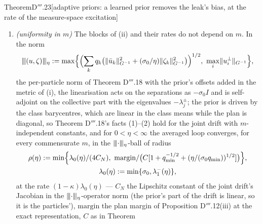 \begin{thm}{Theorem}{D$'''$.23}[adaptive priors: a learned prior removes the leak's bias, at the rate of the
measure-space excitation]
\begin{enumerate}[label=\textup{(\roman*)}]
    the prior follows the class barycentres, $z_j = \hat T_j$, and \textup{($\mathfrak{A}_m^{\mathrm{OT},\eta}$)}
    becomes the gradient flow of $\bar L(\mu_\Theta) + (\sigma_0/2)\mathcal{Q}_q(\mu_\Theta)$, with
    $\mathcal{Q}_q(\mu) := \min_ZW^2(\mu,\nu_Z)$ the capacity-constrained $K_0$-means distortion of $\mu$ ---
    along the plan the flow carries, which is optimal for its own barycentres (Lloyd-consistent) and need not be
    jointly optimal: the flow follows the selected piece of $\mathcal{Q}_q$, and $\mathcal{Q}_q$ itself need not
    decrease (\hyperref[res:thmDppp:27]{Proposition D$'''$.27}(ii)) ---: a regulariser that pulls the network
    toward $K_0$ clusters of the prescribed masses without biasing where they sit.
    The separations keep the rate $\sigma_0$, and mode $j$ of the class means relaxes at $h_j$. It does bias how many
    there are: a target that the network fits exactly only with a class split is fitted with $K_0$ clusters
    (numerics, Part G), so $K_0$ remains a design input.
  \item \emph{(uniformity in $m$)} The blocks of (ii) and their rates do not depend on $m$. In the norm
    \[
      \tnorm{(u,\zeta)}_\eta := \max\Bigl\{\Bigl(\sum_kq_k\bigl(\norm{\bar u_k}^2_{\Ginv}
      + (\sigma_0/\eta)\norm{\zeta_k}^2_{\Ginv}\bigr)\Bigr)^{1/2},\ \max_i\norm{u_i^\perp}_{\Ginv}\Bigr\},
    \]
    the per-particle norm of Theorem D$'''$.18 with the prior's offsets added in the metric of (i), the linearisation
    acts on the separations as $-\sigma_0I$ and is self-adjoint on the collective part with the eigenvalues
    $-\lambda_j^\pm$; the prior is driven by the class barycentres, which are linear in the class means while the
    plan is diagonal, so Theorem D$'''$.18's facts (1)--(2) hold for the joint drift with $m$-independent constants,
    and for $0 < \eta < \infty$ the averaged loop converges, for every commensurate $m$, in the
    $\lvert\kern-0.25ex\lvert\kern-0.25ex\lvert \cdot\rvert\kern-0.25ex\rvert\kern-0.25ex\rvert_\eta$-ball of radius
    \begin{gather*}
      \rho(\eta) := \min\Bigl\{\lambda_0(\eta)/(4C_N),\
      \mathrm{margin}/\bigl(C[1 + q_{\min}^{-1/2} + (\eta/(\sigma_0q_{\min}))^{1/2}]\bigr)\Bigr\},\\
      \lambda_0(\eta) := \min\{\sigma_0,\lambda_1^-(\eta)\},
    \end{gather*}
    at the rate $(1 - \kappa)\lambda_0(\eta)$ --- $C_N$ the Lipschitz constant of the joint drift's Jacobian in the
    $\lvert\kern-0.25ex\lvert\kern-0.25ex\lvert \cdot\rvert\kern-0.25ex\rvert\kern-0.25ex\rvert_\eta$-operator norm (the prior's part of the drift is linear, so it is the particles'),
    $\mathrm{margin}$ the plan margin of Proposition D$'''$.12(iii) at the exact representation, $C$ as in Theorem

\end{enumerate}
\end{thm}
